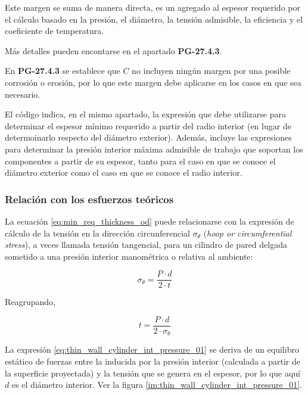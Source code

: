 \begin{itemize}
     Este margen se suma de manera directa, es un agregado al espesor requerido por el cálculo basado en la presión, el diámetro, la tensión admisible, la eficiencia y el coeficiente de temperatura.

     Más detalles pueden encontarse en el apartado \textbf{PG-27.4.3}.

\end{itemize}

En \textbf{PG-27.4.3} se establece que $C$ no incluyen ningún margen por una posible corrosión o erosión, por lo que este margen debe aplicarse en los casos en que sea necesario.

El código indica, en el mismo apartado, la expresión que debe utilizarse para determinar el espesor mínimo requerido a partir del radio interior (en lugar de determoinarlo respecto del diámetro exterior). Además, incluye las expresiones para determinar la presión interior máxima admisible de trabajo que soportan los componentes a partir de su espesor, tanto para el caso en que se conoce el diámetro exterior como el caso en que se conoce el radio interior.

\subsubsection{Relación con los esfuerzos teóricos}

La ecuación \ref{eq:min_req_thickness_od} puede relacionarse con la expresión de cálculo de la tensión en la dirección circunferencial $\sigma_{\theta}$ (\textit{hoop or circumferential stress}), a veces llamada tensión tangencial, para un cilindro de pared delgada sometido a una presión interior manométrica o relativa al ambiente:

\begin{equation}
     \sigma_{\theta}=\frac{P \cdot d}{2 \cdot t}
     \label{eq:thin_wall_cylinder_int_pressure_01}
\end{equation}

Reagrupando,

\begin{equation}
     t=\frac{P \cdot d}{2 \cdot \sigma_{\theta}}
     \label{eq:thin_wall_cylinder_int_pressure_02}
\end{equation}

La expresión \ref{eq:thin_wall_cylinder_int_pressure_01} se deriva de un equilibro estático de fuerzas entre la inducida por la presión interior (calculada a partir de la superficie proyectada) y la tensión que se genera en el espesor, por lo que aquí $d$ es el diámetro interior. Ver la figura \ref{im:thin_wall_cylinder_int_pressure_01}.

